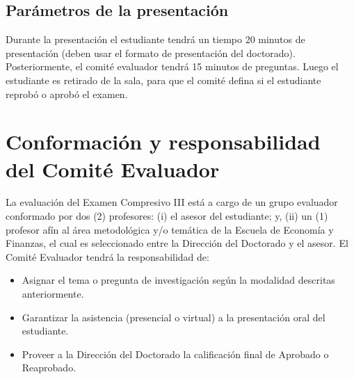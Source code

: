 \subsection{Parámetros de la presentación}

Durante la presentación el estudiante tendrá un tiempo 20 minutos de presentación (deben usar el formato de presentación del doctorado). Posteriormente, el comité evaluador tendrá 15 minutos de preguntas. Luego el estudiante es retirado de la sala, para que el comité defina si el estudiante reprobó o aprobó el examen.

\section{Conformación y responsabilidad del Comité Evaluador}

La evaluación del Examen Compresivo III está a cargo de un grupo evaluador conformado por dos (2) profesores: (i) el asesor del estudiante; y, (ii) un (1) profesor afín al área metodológica y/o temática de la Escuela de Economía y Finanzas, el cual es seleccionado entre la Dirección del Doctorado y el asesor.
El Comité Evaluador tendrá la responsabilidad de:

\begin{itemize}
    \item Asignar el tema o pregunta de investigación según la modalidad descritas anteriormente.
    \item Garantizar la asistencia (presencial o virtual) a la presentación oral del estudiante.
    \item Proveer a la Dirección del Doctorado la calificación final de Aprobado o Reaprobado.
\end{itemize}




